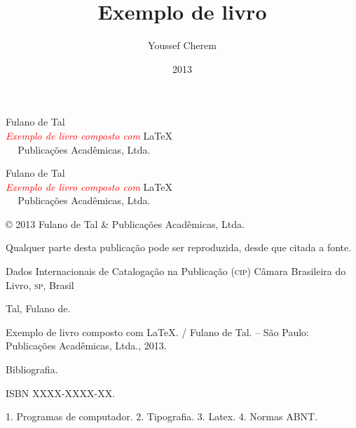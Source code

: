 \documentclass[a5paper]{memoir}
\title{Exemplo de livro}
\author{Youssef Cherem}
\date{2013}
\begin{document}
\frenchspacing

\frontmatter

\begin{titlingpage}

\phantom{xxx}
\vspace{0.5cm}
\huge
\raggedright
Fulano de Tal\\
\vspace{2.5cm}
\Huge 
{\raggedleft
\textit{\textcolor{red}{Exemplo de livro composto com}} \LaTeX\\[1cm]
}
\centering 

\vfill
\Large
 Publicações Acadêmicas, Ltda.

\end{titlingpage}

\begin{titlingpage}

\phantom{xxx}
\vspace{0.5cm}
\huge
\raggedright
Fulano de Tal\\
\vspace{2.5cm}
\Huge 
{\raggedleft
\textit{\textcolor{red}{Exemplo de livro composto com}} \LaTeX\\[1cm]
}
\centering 

\vfill
\Large
 Publicações Acadêmicas, Ltda.

\clearpage
\footnotesize
© 2013 Fulano de Tal \& Publicações Acadêmicas, Ltda.

Qualquer parte desta publicação pode ser reproduzida, desde que citada a fonte.

\bigskip

\begin{center}
Dados Internacionais de Catalogação na Publicação (\textsc{cip})
Câmara Brasileira do Livro, \textsc{sp}, Brasil
\end{center}

\begin{mdframed}
\noindent Tal, Fulano de.

Exemplo de livro composto com \LaTeX. / Fulano de Tal. -- São Paulo: Publicações Acadêmicas, Ltda., 2013.

\medskip

Bibliografia.

ISBN XXXX-XXXX-XX.

\medskip

1. Programas de computador. 2. Tipografia. 3. Latex. 4. Normas ABNT.

\end{mdframed}

\end{titlingpage}
\end{document}
